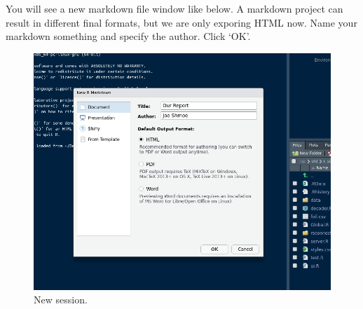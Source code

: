 \documentclass[]{book}
\begin{document}
You will see a new markdown file window like below. A markdown project can result in different final formats, but we are only exporing HTML now. Name your markdown something and specify the author. Click `OK'.

\begin{figure}
\centering
\includegraphics{newMarkdown.png}
\caption{New session.}
\end{figure}
\end{document}
